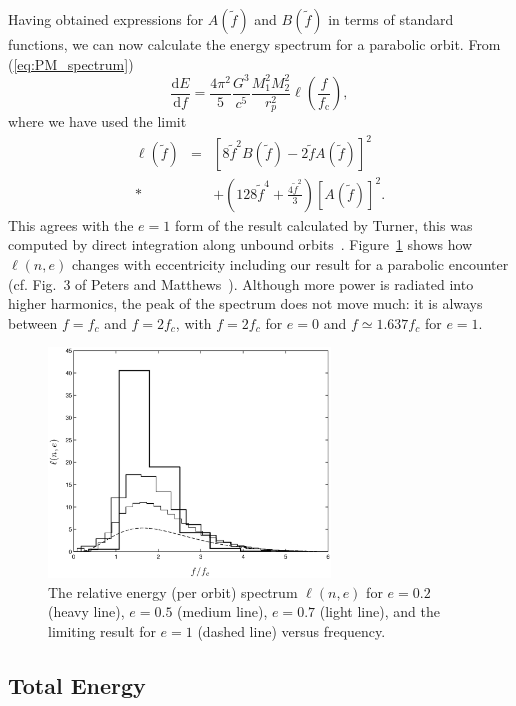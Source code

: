 \documentclass[aps,prd,amsfonts,amssymb,amsmath,nofootinbib,floatfix,reprint,showpacs,groupedaddress]{revtex4-1}
\newcommand{\eqnref}[1]{(\ref{eq:#1})}
\newcommand{\Figref}[1]{Figure~\ref{fig:#1}}
\newcommand{\sub}[1]{\ensuremath{_\text{#1}}}
\newcommand{\dd}{\ensuremath{\mathrm{d}}}
\newcommand{\diff}[2]{\ensuremath{\frac{\dd {#1}}{\dd {#2}}}}
\begin{document}
Having obtained expressions for $A(\tilde{f})$ and $B(\tilde{f})$ in terms of standard functions, we can now calculate the energy spectrum for a parabolic orbit. From \eqnref{PM_spectrum}
\begin{equation}
\diff{E}{f} = \frac{4\pi^2}{5}\frac{G^3}{c^5}\frac{M_1^2M_2^2}{r_{p}^2}\ell\left(\frac{f}{f\sub{c}}\right),
\label{eq:PM_dEdf}
\end{equation}
where we have used the limit
\begin{eqnarray}
\ell(\tilde{f}) & = & \left[8\tilde{f}^2B(\tilde{f}) - 2\tilde{f}A(\tilde{f})\right]^2 \nonumber \\*
 & & + \left(128\tilde{f}^4 + \frac{4\tilde{f}^2}{3}\right)\left[A(\tilde{f})\right]^2.
\end{eqnarray}
This agrees with the $e =1$ form of the result calculated by Turner, this was computed by direct integration along unbound orbits~\cite{Turner1977}. \Figref{ell} shows how $\ell(n,e)$ changes with eccentricity including our result for a parabolic encounter (cf. Fig.~3 of Peters and Matthews~\cite{Peters1963}). Although more power is radiated into higher harmonics, the peak of the spectrum does not move much: it is always between $f = f_{c}$ and $f = 2 f_{c}$, with $f = 2 f_{c}$ for $e = 0$ and $f \simeq 1.637 f_{c}$ for $e = 1$.
\begin{figure}
\includegraphics[width=75mm]{ell_1.eps}
\caption{The relative energy (per orbit) spectrum $\ell(n,e)$ for $e = 0.2$ (heavy line), $e = 0.5$ (medium line), $e = 0.7$ (light line), and the limiting result for $e = 1$ (dashed line) versus frequency.\label{fig:ell}}
\end{figure}

\subsection{Total Energy}
\end{document}
